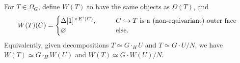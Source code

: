 \documentclass[a4paper,10pt
,draft
]{article}%
\renewcommand{\1}{\eta}%
\begin{document}
\begin{definition}
      For $T \in \Omega_G$,
      define $W(T)$ to have the same objects as $\Omega(T)$, and
      \begin{equation}
            W(T)(C) =
            \begin{cases}
                  \Delta[1]^{\times E^i(C)}, \qquad & C \hookrightarrow T \text{ is a (non-equivariant) outer face}
                  \\
                  \varnothing & \text{else.}
            \end{cases}
      \end{equation}
      Equivalently, given decompositions $T \simeq G \cdot_H U$ and $T \simeq G \cdot U / N$, we have
      $W(T) \simeq G \cdot_H W(U)$ and $W(T) \simeq G \cdot W(U)/N$.
\end{definition}
\end{document}
